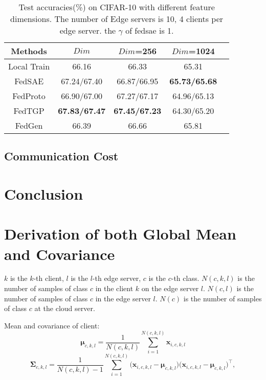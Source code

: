 \documentclass[journal]{IEEEtran}
\begin{document}
\begin{table}[ht]
    \centering
    \caption{Test accuracies(\%) on CIFAR-10 with different feature dimensions. The number of Edge servers is 10, 4 clients per edge server. the $\gamma$ of fedsae is 1.}
    \begin{tabular}{|c|c|c|c|c|}
    \hline
    \textbf{Methods} & $Dim$\newline =64  & $Dim$=256 & $Dim$=1024 \\
    \hline
    Local Train & 66.16 & 66.33 & 65.31 \\
    FedSAE & 67.24/67.40 & 66.87/66.95 & \textbf{65.73/65.68} \\
    FedProto & 66.90/67.00 & 67.27/67.17 & 64.96/65.13 \\
    FedTGP & \textbf{67.83/67.47} & \textbf{67.45/67.23} & 64.30/65.20\\
    FedGen & 66.39 & 66.66 & 65.81 \\
    \hline
    \end{tabular}
\end{table}



\subsection{Communication Cost}

\section{Conclusion}

 



\onecolumn

\section{Derivation of both Global Mean and Covariance}
\(k\) is the \(k\)-th client, \(l\) is the \(l\)-th edge server, \(c\) is the \(c\)-th class. \( N(c,k,l) \) is the number of samples of class \( c \) in the client \( k \) on the edge server \( l \). \( N(c,l) \) is the number of samples of class \( c \) in the edge server \( l \). \( N(c) \) is the number of samples of class \( c \) at the cloud server.

Mean and covariance of client:
\begin{equation}
\mathbf{\mu}_{c,k,l} = \frac{1}{N(c,k,l)} \sum_{i=1}^{N(c,k,l)} \mathbf{x}_{i,c,k,l}
\end{equation}
\begin{equation}
\mathbf{\Sigma}_{c,k,l} = \frac{1}{N(c,k,l)-1} \sum_{i=1}^{N(c,k,l)} \big( \mathbf{x}_{i,c,k,l} - \mathbf{\mu}_{c,k,l} \big) \big( \mathbf{x}_{i,c,k,l} - \mathbf{\mu}_{c,k,l} \big)^\top,
\end{equation}
\end{document}
